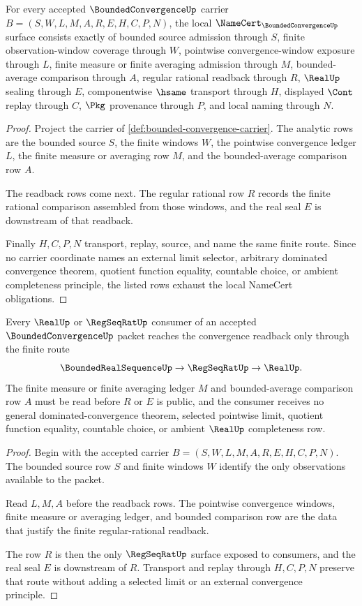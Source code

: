 \begin{theorem}
\label{thm:bounded-convergence-namecert-obligations}
For every accepted $\BoundedConvergenceUp$ carrier $B=(S,W,L,M,A,R,E,H,C,P,N)$, the local $\NameCert_{\BoundedConvergenceUp}$ surface consists exactly of bounded source admission through $S$, finite observation-window coverage through $W$, pointwise convergence-window exposure through $L$, finite measure or finite averaging admission through $M$, bounded-average comparison through $A$, regular rational readback through $R$, $\RealUp$ sealing through $E$, componentwise $\hsame$ transport through $H$, displayed $\Cont$ replay through $C$, $\Pkg$ provenance through $P$, and local naming through $N$.
\end{theorem}
\begin{proof}
Project the carrier of \autoref{def:bounded-convergence-carrier}. The analytic rows are the bounded source $S$, the finite windows $W$, the pointwise convergence ledger $L$, the finite measure or averaging row $M$, and the bounded-average comparison row $A$.

The readback rows come next. The regular rational row $R$ records the finite rational comparison assembled from those windows, and the real seal $E$ is downstream of that readback.

Finally $H,C,P,N$ transport, replay, source, and name the same finite route. Since no carrier coordinate names an external limit selector, arbitrary dominated convergence theorem, quotient function equality, countable choice, or ambient completeness principle, the listed rows exhaust the local NameCert obligations.
\end{proof}

\begin{theorem}
\label{thm:bounded-convergence-finite-measure-handoff}
Every $\RealUp$ or $\RegSeqRatUp$ consumer of an accepted $\BoundedConvergenceUp$ packet reaches the convergence readback only through the finite route
$$
\BoundedRealSequenceUp \to \RegSeqRatUp \to \RealUp .
$$
The finite measure or finite averaging ledger $M$ and bounded-average comparison row $A$ must be read before $R$ or $E$ is public, and the consumer receives no general dominated-convergence theorem, selected pointwise limit, quotient function equality, countable choice, or ambient $\RealUp$ completeness row.
\end{theorem}
\begin{proof}
Begin with the accepted carrier $B=(S,W,L,M,A,R,E,H,C,P,N)$. The bounded source row $S$ and finite windows $W$ identify the only observations available to the packet.

Read $L,M,A$ before the readback rows. The pointwise convergence windows, finite measure or averaging ledger, and bounded comparison row are the data that justify the finite regular-rational readback.

The row $R$ is then the only $\RegSeqRatUp$ surface exposed to consumers, and the real seal $E$ is downstream of $R$. Transport and replay through $H,C,P,N$ preserve that route without adding a selected limit or an external convergence principle.
\end{proof}

